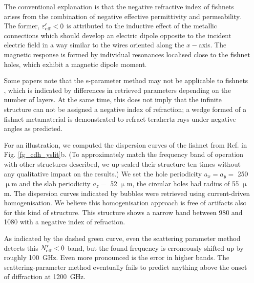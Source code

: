 
The conventional explanation is that the negative refractive index of fishnets arises from the combination of negative effective permittivity and permeability. The former, $\varepsilon_{\text{eff} }'<0$ is attributed to the inductive effect of the metallic connections which should develop an electric dipole opposite to the incident electric field in a way similar to the wires oriented along the $x-$axis. The magnetic response is formed by individual resonances localised close to the fishnet holes, which exhibit a magnetic dipole moment.

Some papers note that the s-parameter method may not be applicable to fishnets \cite{croenne2009left}\cite[p. 102]{croenne2009controle}, which is indicated by differences in retrieved parameters depending on the number of layers. At the same time, this does not imply that the infinite structure can not be assigned a negative index of refraction; a wedge formed  of a fishnet metamaterial is demonstrated to refract terahertz rays under negative angles \cite{wang2010composite} as predicted. 

For an illustration, we computed the dispersion curves of the fishnet from Ref. \cite{navarro2011dual} in Fig. \ref{fg_cdh_yslit}b. (To approximately match the frequency band of operation with other structures described, we up-scaled their structure ten times without any qualitative impact on the results.) We set the hole periodicity $a_x=a_y =$ 250 $\upmu$m and the slab periodicity $a_z =$ 52 $\upmu$m, the circular holes had radius of 55 $\upmu$m. The dispersion curves indicated by bubbles were retrieved using current-driven homogenisation. We believe this homogenisation approach is free of artifacts also for this kind of structure. This structure shows a narrow band between 980 and 1080 with a negative index of refraction. 

As indicated by the dashed green curve, even the scattering parameter method detects this $N_{\text{eff} }'<0$ band, but the found frequency is erroneously shifted up by roughly 100~GHz. Even more pronounced is the error in higher bands. The scattering-parameter method eventually fails to predict anything above the onset of diffraction at 1200~GHz.

